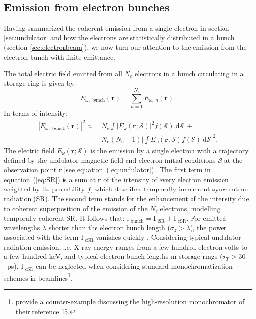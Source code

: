 \documentclass{iucr}
\begin{document}
\subsection{Emission from electron bunches}

Having summarized the coherent emission from a single electron in section \ref{sec:undulator} and how the electrons are statistically distributed in a bunch (section \ref{sec:electronbeam}), we now turn our attention to the emission from the electron bunch with finite emittance.

The total electric field emitted from all $N_e$ electrons in a bunch circulating in a storage ring is given by: 
\begin{equation}
    E_{\omega,\text{~bunch}}(\textbf{r}) = \sum_{n=1}^{N_e} E_{\omega,~n}(\textbf{r}).
\end{equation}
In terms of intensity: 
\begin{equation}
\begin{split}
|E_{\omega,\text{~bunch}}(\textbf{r})|^2 \approx ~&N_\text{e} \int\big| E_\omega(\textbf{r};\mathcal{S})\big|^2 f(\mathcal{S})~ \text{d}\mathcal{S}~+\\
+~ &N_\text{e}(N_\text{e}-1)\bigg| \int E_\omega(\textbf{r};\mathcal{S}) f(\mathcal{S})~ \text{d}\mathcal{S} \bigg|^2.
\end{split}
\label{eq:SR}
\end{equation}
The electric field $E_\omega(\textbf{r};\mathcal{S})$ is the emission by a single electron with a trajectory defined by the undulator magnetic field and electron initial conditions $\mathcal{S}$
at the observation point $\textbf{r}$ [see equation~(\ref{eq:undulator})]. The first term in equation~(\ref{eq:SR}) is a sum at $\textbf{r}$ of the intensity of every electron emission weighted by its probability $f$, which describes temporally incoherent synchrotron radiation (SR). The second term stands for the enhancement of the intensity due to coherent superposition of the emission of the $N_e$ electrons, modelling temporally coherent SR. It follows that: $\text{I}_\text{~bunch} = \text{I}_\text{~iSR}+\text{I}_\text{~cSR}$.
For emitted wavelengths $\lambda$ shorter than the electron bunch length ($\sigma_z > \lambda$), the power associated with the term $\text{I}_\text{~cSR}$ vanishes quickly \cite{CSR,Wiedemann2015}. Considering typical undulator radiation emission, i.e. X-ray energy ranges from a few hundred electron-volts to a few hundred keV, and typical electron bunch lengths in storage rings ($\sigma_{T}>30$~ps), $\text{I}_\text{~cSR}$ can be neglected when considering standard monochromatization schemes in beamlines\footnote{ provide a counter-example discussing the high-resolution monochromator of their reference 15.}.
\end{document}

